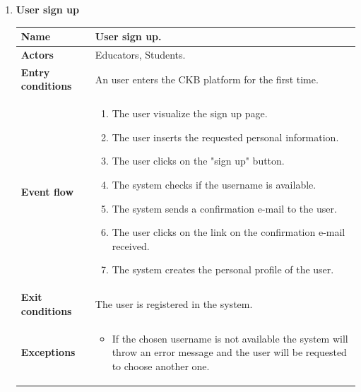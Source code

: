     \begin{enumerate}[label=\textbf{UC.\arabic*}]
        \item {} \textbf{User sign up}
        \begin{table}[h]
    	    \centering
                \renewcommand{\arraystretch}{1.5}
                \begin{tabular}{|m{3.2cm}|m{9.8cm}|}
                    \hline
                    \textbf{Name} & User sign up. \\
                    \hline
                    \textbf{Actors} & Educators, Students. \\
                    \hline
                    \textbf{Entry conditions}  & An user enters the CKB platform for the first time. \\
                    \hline
                    \textbf{Event flow}  & 
                    \begin{enumerate}[label=\arabic*.]
                        \item The user visualize the sign up page.
                        \item The user inserts the requested personal information.
                        \item The user clicks on the "sign up" button.
                        \item The system checks if the username is available.
                        \item The system sends a confirmation e-mail to the user.
                        \item The user clicks on the link on the confirmation e-mail received.
                        \item The system creates the personal profile of the user.
                    \end{enumerate}\\
                    \hline
                    \textbf{Exit conditions}  & The user is registered in the system. \\
                    \hline
                    \textbf{Exceptions}  & 
                    \begin{itemize}
                        \item If the chosen username is not available the system will throw an error message and the user will be requested to choose another one.
                    \end{itemize} \\
                    \hline 

\end{tabular}
\end{table}
\end{enumerate}
